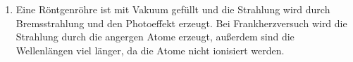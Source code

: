 \documentclass[11pt, a4paper]{article}
\begin{document}
\begin{enumerate}
        \item Eine Röntgenröhre ist mit Vakuum gefüllt und die Strahlung wird durch Bremsstrahlung und den Photoeffekt erzeugt. Bei Frankherzversuch wird die Strahlung durch die angergen Atome erzeugt, außerdem sind die Wellenlängen viel länger, da die Atome nicht ionisiert werden. 
        
        
    \end{enumerate}

        

    
    
\end{document}
